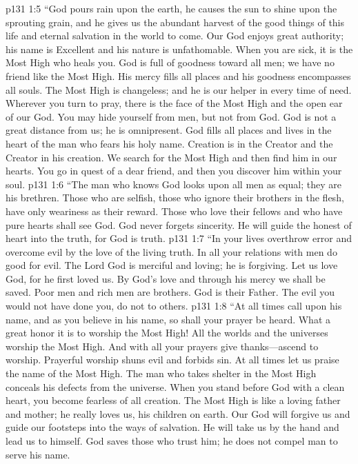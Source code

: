 \vs p131 1:5 “God pours rain upon the earth, he causes the sun to shine upon the sprouting grain, and he gives us the abundant harvest of the good things of this life and eternal salvation in the world to come. Our God enjoys great authority; his name is Excellent and his nature is unfathomable. When you are sick, it is the Most High who heals you. God is full of goodness toward all men; we have no friend like the Most High. His mercy fills all places and his goodness encompasses all souls. The Most High is changeless; and he is our helper in every time of need. Wherever you turn to pray, there is the face of the Most High and the open ear of our God. You may hide yourself from men, but not from God. God is not a great distance from us; he is omnipresent. God fills all places and lives in the heart of the man who fears his holy name. Creation is in the Creator and the Creator in his creation. We search for the Most High and then find him in our hearts. You go in quest of a dear friend, and then you discover him within your soul.
\vs p131 1:6 “The man who knows God looks upon all men as equal; they are his brethren. Those who are selfish, those who ignore their brothers in the flesh, have only weariness as their reward. Those who love their fellows and who have pure hearts shall see God. God never forgets sincerity. He will guide the honest of heart into the truth, for God is truth.
\vs p131 1:7 “In your lives overthrow error and overcome evil by the love of the living truth. In all your relations with men do good for evil. The Lord God is merciful and loving; he is forgiving. Let us love God, for he first loved us. By God’s love and through his mercy we shall be saved. Poor men and rich men are brothers. God is their Father. The evil you would not have done you, do not to others.
\vs p131 1:8 “At all times call upon his name, and as you believe in his name, so shall your prayer be heard. What a great honor it is to worship the Most High! All the worlds and the universes worship the Most High. And with all your prayers give thanks---ascend to worship. Prayerful worship shuns evil and forbids sin. At all times let us praise the name of the Most High. The man who takes shelter in the Most High conceals his defects from the universe. When you stand before God with a clean heart, you become fearless of all creation. The Most High is like a loving father and mother; he really loves us, his children on earth. Our God will forgive us and guide our footsteps into the ways of salvation. He will take us by the hand and lead us to himself. God saves those who trust him; he does not compel man to serve his name.
